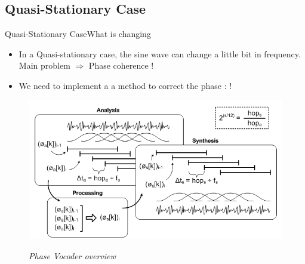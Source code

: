 \documentclass{bredelebeamer}
\begin{document}
\subsection{Quasi-Stationary Case}
\begin{frame}{Quasi-Stationary Case}{What is changing}
\begin{itemize}
\item In a Quasi-stationary case, the sine wave can change a little bit in frequency. \\
 Main problem $\Rightarrow$ Phase coherence !
\item We need to implement a a method to correct the phase :   !
\end{itemize}

\begin{figure}
{\includegraphics[scale=0.45]{pvoverview.png}}
	\caption{\it Phase Vocoder overview}
\end{figure}


\end{frame}
\end{document}
